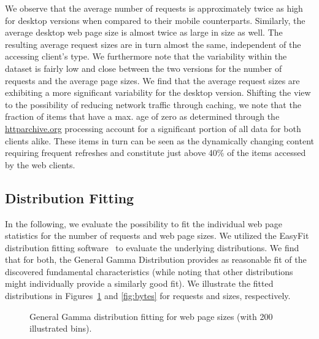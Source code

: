 \documentclass[letterpaper,conference]{IEEEtran}
\begin{document}
We observe that the average number of requests is approximately twice as high for desktop versions when compared to their mobile counterparts. Similarly, the average desktop web page size is almost twice as large in size as well. The resulting average request sizes are in turn almost the same, independent of the accessing client's type.
We furthermore note that the variability within the dataset is fairly low and close between the two versions for the number of requests and the average page sizes.
We find that the average request sizes are exhibiting a more significant variability for the desktop version. 
Shifting the view to the possibility of reducing network traffic through caching, we note that the fraction of items that have a max. age of zero as determined through the \url{httparchive.org} processing account for a significant portion of all data for both clients alike. These items in turn can be seen as the dynamically changing content requiring frequent refreshes and constitute just above 40\% of the items accessed by the web clients.


\subsection{Distribution Fitting}
In the following, we evaluate the possibility to fit the individual web page statistics for the number of requests and web page sizes. 
We utilized the EasyFit distribution fitting software~\cite{Ma13} to evaluate the underlying distributions. 
We find that for both, the General Gamma Distribution provides as reasonable fit of the discovered fundamental characteristics (while noting that other distributions might individually provide a similarly good fit). 
We illustrate the fitted distributions in Figures~\ref{fig:reqs} and \ref{fig:bytes} for requests and sizes, respectively.
\begin{figure}[t]
	\centering
	\label{fig:freqs}
	
	\label{fig:mreqs}
	\caption{General Gamma distribution fitting for web page sizes (with 200 illustrated bins).\label{fig:reqs}}
\end{figure}
\end{document}
